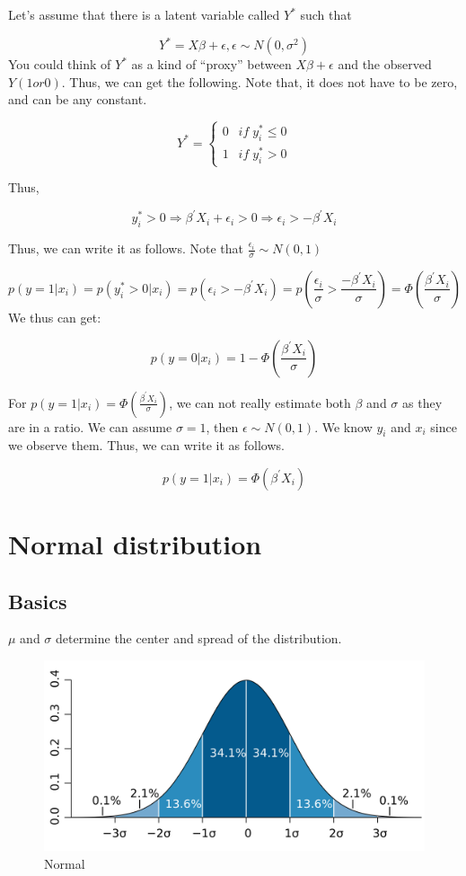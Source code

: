 \documentclass[
]{book}
\begin{document}
Let's assume that there is a latent variable called \(Y^*\) such that

\[Y^*=X\beta+\epsilon, \epsilon \sim N(0,\sigma^2)\]
You could think of \(Y^*\) as a kind of ``proxy'' between \(X\beta+\epsilon\) and the observed \(Y (1 or 0)\). Thus, we can get the following. Note that, it does not have to be zero, and can be any constant.

\[
Y^*=\begin{cases} 0 \;\;\: if \;  y_i^* \leq 0 \\ 1 \;\;\: if \;  y_i^* > 0 \end{cases}
\]

Thus,

\[y_i^* > 0 \Rightarrow \beta^{'}X_i + \epsilon_i >0 \Rightarrow \epsilon_i > -\beta^{'}X_i\]

Thus, we can write it as follows. Note that \(\frac{ \epsilon_i}{\sigma} \sim N(0,1)\)

\[p(y=1|x_i)= p(y_i^* >0|x_i)=p(\epsilon_i > -\beta^{'}X_i)= p(\frac{ \epsilon_i}{\sigma}>\frac{-\beta^{'}X_i}{\sigma})=\Phi(\frac{\beta^{'}X_i}{\sigma}) \]
We thus can get:

\[p(y=0|x_i)=1-\Phi(\frac{\beta^{'}X_i}{\sigma})\]

For \(p(y=1|x_i)=\Phi(\frac{\beta^{'}X_i}{\sigma})\), we can not really estimate both \(\beta\) and \(\sigma\) as they are in a ratio. We can assume \(\sigma =1\), then \(\epsilon \sim N(0,1)\).
We know \(y_i\) and \(x_i\) since we observe them. Thus, we can write it as follows.

\[p(y=1|x_i)=\Phi(\beta^{'}X_i)\]

\hypertarget{normal-distribution}{%
\chapter{Normal distribution}\label{normal-distribution}}

\hypertarget{basics}{%
\section{Basics}\label{basics}}

\(\mu\) and \(\sigma\) determine the center and spread of the distribution.

\begin{figure}
\centering
\includegraphics{Standard_deviation_diagram.PNG}
\caption{Normal}
\end{figure}
\end{document}
